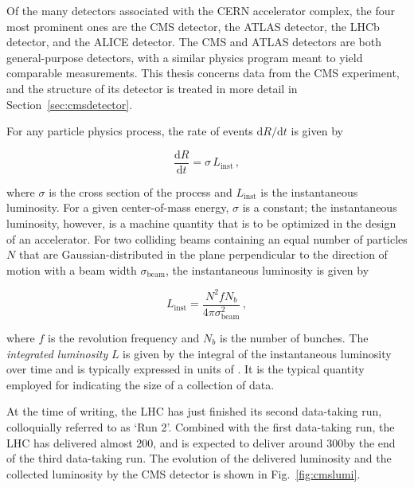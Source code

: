Of the many detectors associated with the CERN accelerator complex, the four most prominent ones are the CMS detector, the ATLAS detector, the LHCb detector, and the ALICE detector.
% 
The CMS and ATLAS detectors are both general-purpose detectors, with a similar physics program meant to yield comparable measurements.
% 
This thesis concerns data from the CMS experiment, and the structure of its detector is treated in more detail in Section~\ref{sec:cmsdetector}.


For any particle physics process, the rate of events $\mathrm{d}R/\mathrm{d}t$ is given by
% 
\begin{linenomath*}
\begin{equation}
\frac{\mathrm{d}R}{\mathrm{d}t} = \sigma \, L_\text{inst}
\,,
\end{equation}
\end{linenomath*}
% 
where $\sigma$ is the cross section of the process and $L_\text{inst}$ is the instantaneous luminosity.
% 
For a given center-of-mass energy, $\sigma$ is a constant; the instantaneous luminosity, however, is a machine quantity that is to be optimized in the design of an accelerator.
% 
For two colliding beams containing an equal number of particles $N$ that are Gaussian-distributed in the plane perpendicular to the direction of motion with a beam width $\sigma_\text{beam}$, the instantaneous luminosity is given by~\cite{griffiths}
% 
\begin{linenomath*}
\begin{equation}
L_\text{inst} =
\frac{
    N^2 f N_b 
    }{
    4 \pi \sigma_\text{beam}^2
    }
\,,
\end{equation}
\end{linenomath*}
% 
where $f$ is the revolution frequency and $N_b$ is the number of bunches.
% 
The \textit{integrated luminosity} $L$ is given by the integral of the instantaneous luminosity over time and is typically expressed in units of \fbinv.
% 
It is the typical quantity employed for indicating the size of a collection of data.


At the time of writing, the LHC has just finished its second data-taking run, colloquially referred to as `Run 2'.
% 
Combined with the first data-taking run, the LHC has delivered almost 200\fbinv, and is expected to deliver around 300\fbinv by the end of the third data-taking run.
% 
The evolution of the delivered luminosity and the collected luminosity by the CMS detector is shown in Fig.~\ref{fig:cmslumi}.

